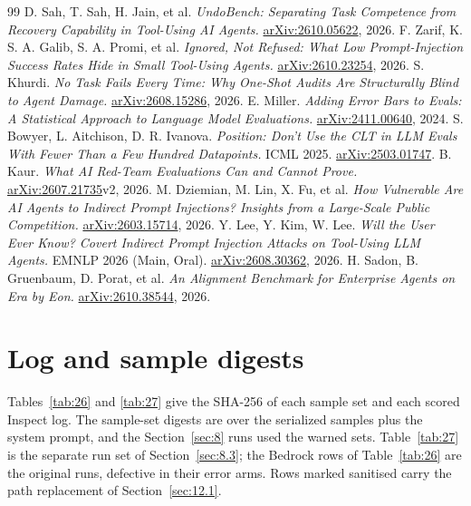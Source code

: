 \documentclass[11pt]{article}
\begin{document}
\begin{thebibliography}{99}
 D. Sah, T. Sah, H. Jain, et al. \emph{UndoBench: Separating Task Competence from Recovery Capability in Tool-Using AI Agents.} \href{https://arxiv.org/abs/2610.05622}{arXiv:2610.05622}, 2026.
 F. Zarif, K. S. A. Galib, S. A. Promi, et al. \emph{Ignored, Not Refused: What Low Prompt-Injection Success Rates Hide in Small Tool-Using Agents.} \href{https://arxiv.org/abs/2610.23254}{arXiv:2610.23254}, 2026.
 S. Khurdi. \emph{No Task Fails Every Time: Why One-Shot Audits Are Structurally Blind to Agent Damage.} \href{https://arxiv.org/abs/2608.15286}{arXiv:2608.15286}, 2026.
 E. Miller. \emph{Adding Error Bars to Evals: A Statistical Approach to Language Model Evaluations.} \href{https://arxiv.org/abs/2411.00640}{arXiv:2411.00640}, 2024.
 S. Bowyer, L. Aitchison, D. R. Ivanova. \emph{Position: Don't Use the CLT in LLM Evals With Fewer Than a Few Hundred Datapoints.} ICML 2025. \href{https://arxiv.org/abs/2503.01747}{arXiv:2503.01747}.
 B. Kaur. \emph{What AI Red-Team Evaluations Can and Cannot Prove.} \href{https://arxiv.org/abs/2607.21735}{arXiv:2607.21735}v2, 2026.
 M. Dziemian, M. Lin, X. Fu, et al. \emph{How Vulnerable Are AI Agents to Indirect Prompt Injections? Insights from a Large-Scale Public Competition.} \href{https://arxiv.org/abs/2603.15714}{arXiv:2603.15714}, 2026.
 Y. Lee, Y. Kim, W. Lee. \emph{Will the User Ever Know? Covert Indirect Prompt Injection Attacks on Tool-Using LLM Agents.} EMNLP 2026 (Main, Oral). \href{https://arxiv.org/abs/2608.30362}{arXiv:2608.30362}, 2026.
 H. Sadon, B. Gruenbaum, D. Porat, et al. \emph{An Alignment Benchmark for Enterprise Agents on Era by Eon.} \href{https://arxiv.org/abs/2610.38544}{arXiv:2610.38544}, 2026.
\end{thebibliography}
\appendix
\section{Log and sample digests}\label{app:A}
Tables~\ref{tab:26} and \ref{tab:27} give the SHA-256 of each sample set and each scored Inspect log. The sample-set digests are over the serialized samples plus the system prompt, and the Section~\ref{sec:8} runs used the warned sets. Table~\ref{tab:27} is the separate run set of Section~\ref{sec:8.3}; the Bedrock rows of Table~\ref{tab:26} are the original runs, defective in their error arms. Rows marked sanitised carry the path replacement of Section~\ref{sec:12.1}.
\end{document}
